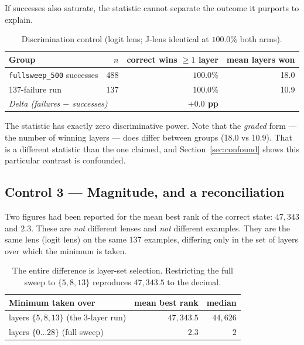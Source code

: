 \documentclass[11pt]{article}
\newcommand{\code}[1]{\texttt{\small #1}}
\newcommand{\fail}[1]{\textcolor{bad}{\textbf{#1}}}
\begin{document}
If successes also saturate, the statistic cannot separate the outcome it purports to explain.

\begin{table}[h]
\centering\small
\begin{tabular}{lrrr}
\toprule
Group & $n$ & correct wins $\geq 1$ layer & mean layers won \\
\midrule
\code{fullsweep\_500} successes & 488 & \fail{$100.0\%$} & 18.0 \\
137-failure run                 & 137 & $100.0\%$        & 10.9 \\
\midrule
\multicolumn{2}{l}{\itshape Delta (failures $-$ successes)} & \fail{$+0.0$ pp} & \\
\bottomrule
\end{tabular}
\caption{Discrimination control (logit lens; J-lens identical at $100.0\%$ both arms).}
\end{table}

The statistic has exactly zero discriminative power. Note that the \emph{graded} form ---
the number of winning layers --- does differ between groups (18.0 vs 10.9). That is a
different statistic than the one claimed, and Section~\ref{sec:confound} shows this
particular contrast is confounded.

\subsection{Control 3 --- Magnitude, and a reconciliation}
\label{sec:magnitude}

Two figures had been reported for the mean best rank of the correct state: $47{,}343$ and
$2.3$. These are \emph{not} different lenses and \emph{not} different examples. They are the
same lens (logit lens) on the same 137 examples, differing only in the set of layers over
which the minimum is taken.

\begin{table}[h]
\centering\small
\begin{tabular}{lrr}
\toprule
Minimum taken over & mean best rank & median \\
\midrule
layers $\{5, 8, 13\}$ (the 3-layer run) & $47{,}343.5$ & $44{,}626$ \\
layers $\{0 \ldots 28\}$ (full sweep)   & $2.3$        & $2$ \\
\bottomrule
\end{tabular}
\caption{The entire difference is layer-set selection. Restricting the full sweep to
$\{5,8,13\}$ reproduces $47{,}343.5$ to the decimal.}
\end{table}
\end{document}
